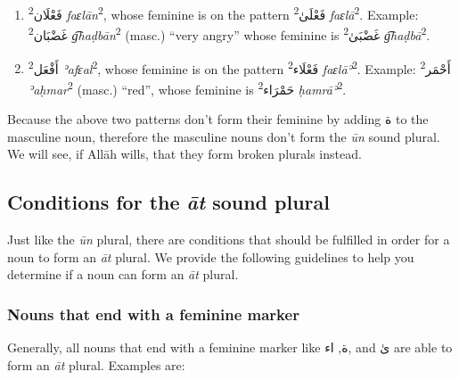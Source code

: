 \documentclass[
  10pt,
]{book}
\providecommand{\tightlist}{%
  \setlength{\itemsep}{0pt}\setlength{\parskip}{0pt}}
\begin{document}
\begin{enumerate}
\def\labelenumi{\roman{enumi}.}
\tightlist
\item
  \textsuperscript{2}\foreignlanguage{arabic}{فَعْلَان} \emph{faɛlān}\textsuperscript{2}, whose feminine is on the pattern \textsuperscript{2}\foreignlanguage{arabic}{فَعْلَىٰ} \emph{faɛlā}\textsuperscript{2}. Example: \textsuperscript{2}\foreignlanguage{arabic}{غَضْبَان} \emph{g͡haḍbān}\textsuperscript{2} (masc.) \enquote{very angry} whose feminine is \textsuperscript{2}\foreignlanguage{arabic}{غَضْبَىٰ} \emph{g͡haḍbā}\textsuperscript{2}.
\item
  \textsuperscript{2}\foreignlanguage{arabic}{أَفْعَل} \emph{ʾafɛal}\textsuperscript{2}, whose feminine is on the pattern \textsuperscript{2}\foreignlanguage{arabic}{فَعْلَاء} \emph{faɛlāʾ}\textsuperscript{2}. Example: \textsuperscript{2}\foreignlanguage{arabic}{أَحْمَر} \emph{ʾaḥmar}\textsuperscript{2} (masc.) \enquote{red}, whose feminine is \textsuperscript{2}\foreignlanguage{arabic}{حَمْرَاء} \emph{ḥamrāʾ}\textsuperscript{2}.
\end{enumerate}

Because the above two patterns don't form their feminine by adding \foreignlanguage{arabic}{ة} to the masculine noun, therefore the masculine nouns don't form the \emph{ūn} sound plural. We will see, if Allāh wills, that they form broken plurals instead.

\subsection{\texorpdfstring{Conditions for the \emph{āt} sound plural}{Conditions for the āt sound plural}}\label{conditions-for-the-at-plural}

Just like the \emph{ūn} plural, there are conditions that should be fulfilled in order for a noun to form an \emph{āt} plural.
We provide the following guidelines to help you determine if a noun can form an \emph{āt} plural.

\subsubsection{Nouns that end with a feminine marker}\label{nouns-that-end-with-a-feminine-marker}

Generally, all nouns that end with a feminine marker like
\foreignlanguage{arabic}{ة}, \foreignlanguage{arabic}{اء}, and \foreignlanguage{arabic}{ىٰ}
are able to form an \emph{āt} plural.
Examples are:
\end{document}
